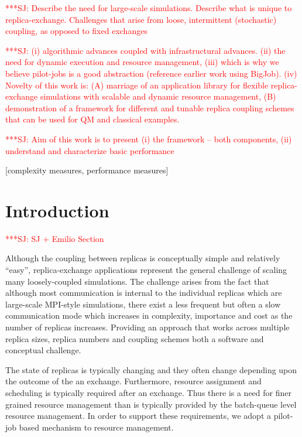 \documentclass{sig-alternate}
\newcommand{\jhanote}[1]{ {\textcolor{red} { ***SJ: #1 }}}
\newcommand{\jhanote}[1]{}
\begin{document}
\jhanote{Describe the need for large-scale simulations. Describe what
  is unique to replica-exchange. Challenges that arise from loose,
  intermittent (stochastic) coupling, as opposed to fixed exchanges}


\jhanote{(i) algorithmic advances coupled with infrastructural
  advances. (ii) the need for dynamic execution and resource
  management, (iii) which is why we believe pilot-jobs is a good
  abstraction (reference earlier work using BigJob). (iv) Novelty of
  this work is: (A) marriage of an application library for flexible
  replica-exchange simulations with scalable and dynamic resource
  management, (B) demonstration of a framework for different and
  tunable replica coupling schemes that can be used for QM and
  classical examples.}
 
\jhanote{Aim of this work is to present (i) the framework -- both
  components, (ii) understand and characterize basic performance}




[complexity measures, performance measures]



\section{Introduction}
\jhanote{SJ + Emilio Section}

Although the coupling between replicas is conceptually simple and
relatively ``easy'', replica-exchange applications represent the
general challenge of scaling many loosely-coupled simulations. The
challenge arises from the fact that although most communication is
internal to the individual replicas which are large-scale MPI-style
simulations, there exist a less frequent but often a slow
communication mode which increases in complexity, importance and cost
as the number of replicas increases. Providing an approach that works
across multiple replica sizes, replica numbers and coupling schemes
both a software and conceptual challenge.


The state of replicas is typically changing and they often change
depending upon the outcome of the an exchange. Furthermore, resource
assignment and scheduling is typically required after an exchange.
Thus there is a need for finer grained resource management than is
typically provided by the batch-queue level resource management.  In
order to support these requirements, we adopt a pilot-job based
mechanism to resource management.
 
\end{document}
